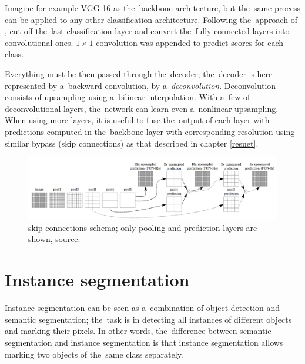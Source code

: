 Imagine for example VGG-16 as the~backbone architecture, but the~same process 
can be applied to any other classification architecture. Following the~approach 
of \cite{fcns}, cut off the~last classification layer and convert the~fully 
connected layers into convolutional ones. $1 \times 1$ convolution was appended 
to predict scores for each class. 

Everything must be then passed through the~decoder; the~decoder is here 
represented by a~backward convolution, by a~\textit{deconvolution}. 
Deconvolution consists of upsampling using a~bilinear interpolation. With a~few 
of deconvolutional layers, the~network can learn even a~nonlinear upsampling. 
When using more layers, it is useful to fuse the~output of each layer with 
predictions computed in the~backbone layer with corresponding resolution using 
similar bypass (skip connections) as that described in chapter \ref{resnet}.

\begin{figure}[H]
   \centering
	\includegraphics[width=\linewidth]{./pictures/fcns-bypass.png}
	\caption[Bypass in Fully convolutional network]{ skip connections 
schema; only pooling and prediction layers are shown, source: \cite{fcns}}
      \label{fig:fcns-bypass}
\end{figure}


\section{Instance segmentation}
\label{instance-segmentation}

Instance segmentation can be seen as a~combination of object detection and 
semantic segmentation; the~task is in detecting all instances of different 
objects and marking their pixels. In other words, the~difference between 
semantic segmentation and instance segmentation is that instance segmentation 
allows marking two objects of the~same class separately.

